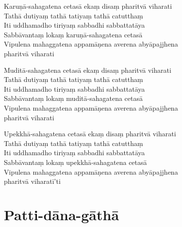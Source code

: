 Karuṇā-sahagatena cetasā ekaṃ disaṃ pharitvā viharati\\
Tathā dutiyaṃ tathā tatiyaṃ tathā catutthaṃ\\
Iti uddhamadho tiriyaṃ sabbadhi sabbattatāya\\
Sabbāvantaṃ lokaṃ karuṇā-sahagatena cetasā\\
Vipulena mahaggatena appamāṇena averena abyāpajjhena\\
\vin pharitvā viharati

Muditā-sahagatena cetasā ekaṃ disaṃ pharitvā viharati\\
Tathā dutiyaṃ tathā tatiyaṃ tathā catutthaṃ\\
Iti uddhamadho tiriyaṃ sabbadhi sabbattatāya\\
Sabbāvantaṃ lokaṃ muditā-sahagatena cetasā\\
Vipulena mahaggatena appamāṇena averena abyāpajjhena\\
\vin pharitvā viharati

Upekkhā-sahagatena cetasā ekaṃ disaṃ pharitvā viharati\\
Tathā dutiyaṃ tathā tatiyaṃ tathā catutthaṃ\\
Iti uddhamadho tiriyaṃ sabbadhi sabbattatāya\\
Sabbāvantaṃ lokaṃ upekkhā-sahagatena cetasā\\
Vipulena mahaggatena appamāṇena averena abyāpajjhena\\
\vin pharitvā viharatī'ti


\section{Patti-dāna-gāthā}

\begin{leader}
\end{leader}


\enlargethispage{\baselineskip}


